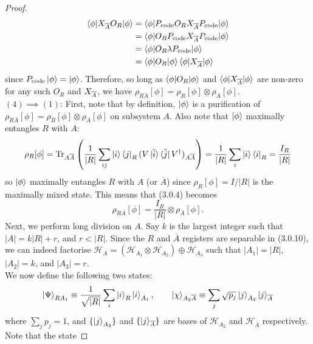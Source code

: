 \documentclass[12pt,a4paper]{report}
\numberwithin{equation}{section}
\newcommand{\ketbra}[2]{\ket{#1}\bra{#2}}
\newcommand{\ketbras}[1]{\ketbra{#1}{#1}}
\newcommand{\Pc}{P_{\text{code}}}
\newcommand{\ol}[1]{\overline{#1}}
\theoremstyle{definition}
\theoremstyle{theorem}
\theoremstyle{theorem}
\theoremstyle{example}
\theoremstyle{definition}
\begin{document}
\begin{proof}
	\begin{equation}
		\begin{aligned}
			\braket{\phi|\Xabar O_{R}|\phi}&=\braket{\phi|\Pc O_{R}\Xabar\Pc|\phi}\\&=\braket{\phi|O_{R}\Pc\Xabar\Pc|\phi}\\&=\braket{\phi|O_{R}\lambda\Pc|\phi}\\&=\braket{\phi|O_{R}|\phi}\braket{\phi|\Xabar|\phi}
		\end{aligned}
	\end{equation} 
	since $\Pc\ket{\phi}=\ket{\phi}$. Therefore, so long as $\braket{\phi|O_{R}|\phi}$ and $\braket{\phi|X_{\overline{A}}|\phi}$ are non-zero for any such $O_{R}$ and $X_{\overline{A}}$, we have $\rho_{R\overline{A}}[\phi]=\rho_{R}[\phi]\otimes\rho_{\overline{A}}[\phi]$.\\
	$(4)\implies (1)$: First, note that by definition, $\ket{\phi}$ is a purification of $\rho_{R\overline{A}}[\phi]=\rho_{R}[\phi]\otimes\rho_{\overline{A}}[\phi]$ on subsystem $A$. Also note that $\ket{\phi}$ maximally entangles $R$ with $A$:
	\begin{equation}
		\rho_{R}[\phi]=\text{Tr}_{A\overline{A}}\left(\frac{1}{|R|}\sum_{ij}\ketbra{i}{j}_{R}(V\ketbra{\tilde{i}}{\tilde{j}}V^{\dagger})_{A\overline{A}}\right)=\frac{1}{|R|}\sum_{i}\ketbras{i}_{R}=\frac{I_{R}}{|R|}
	\end{equation}
	so $\ket{\phi}$ maximally entangles $R$ with $A$ (or $\overline{A}$) since $\rho_{R}[\phi]=I/|R|$ is the maximally mixed state. This means that (3.0.4) becomes
	\begin{equation}
		\rho_{R\overline{A}}[\phi]=\frac{I_{R}}{|R|}\otimes\rho_{\overline{A}}[\phi].
	\end{equation}
	Next, we perform long division on $A$. Say $k$ is the largest integer such that $|A|=k|R|+r$, and $r<|R|$. Since the $R$ and $\overline{A}$ registers are separable in (3.0.10), we can indeed factorise $\mathcal{H}_{A}=\left(\mathcal{H}_{A_{1}}\otimes\mathcal{H}_{A_{2}}\right)\oplus\mathcal{H}_{A_{3}}$ such that $|A_{1}|=|R|$, $|A_{2}|=k$, and $|A_{3}|=r$.\\
	We now define the following two states:
	\begin{equation}
		\ket{\Psi}_{RA_{1}}\equiv\frac{1}{\sqrt{|R|}}\sum_{i}\ket{i}_{R}\ket{i}_{A_{1}},\qquad\ket{\chi}_{A_{2}\overline{A}}\equiv\sum_{j}\sqrt{p_{j}}\ket{j}_{A_{2}}\ket{j}_{\overline{A}}
	\end{equation}
	where $\sum_{j}p_{j}=1$, and $\{\ket{j}_{A_{2}}\}$ and $\{\ket{j}_{\ol{A}}\}$ are bases of $\mathcal{H}_{A_{2}}$ and $\mathcal{H}_{\ol{A}}$ respectively. Note that the state

\end{proof}
\end{document}
